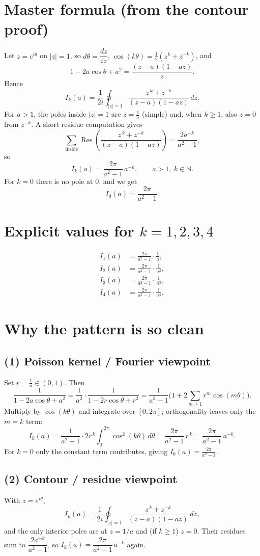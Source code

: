 \documentclass[11pt]{article}
\DeclareMathOperator{\Res}{Res}
\begin{document}
\section*{Master formula (from the contour proof)}
Let $z=e^{i\theta}$ on $|z|=1$, so $d\theta=\dfrac{dz}{iz}$, $\cos(k\theta)=\tfrac12(z^k+z^{-k})$, and
\[
1-2a\cos\theta+a^2=\frac{(z-a)(1-az)}{z}.
\]
Hence
\[
I_k(a)=\frac{1}{2i}\oint_{|z|=1}\frac{z^{\,k}+z^{-k}}{(z-a)(1-az)}\,dz.
\]
For $a>1$, the poles inside $|z|=1$ are $z=\frac1a$ (simple) and, when $k\ge1$, also $z=0$ from $z^{-k}$.
A short residue computation gives
\[
\sum_{\text{inside}}\Res
\left(\frac{z^{\,k}+z^{-k}}{(z-a)(1-az)}\right)
=\frac{2a^{-k}}{a^2-1},
\]
so
\[
\boxed{\ I_k(a)=\frac{2\pi}{a^2-1}\,a^{-k},\qquad a>1,\ k\in\mathbb N.\ }
\]
For $k=0$ there is no pole at $0$, and we get
\[
\boxed{\ I_0(a)=\frac{2\pi}{a^2-1}. \ }
\]

\section*{Explicit values for $k=1,2,3,4$}
\[
\begin{aligned}
	I_1(a) &= \frac{2\pi}{a^2-1}\cdot \frac{1}{a},\\[4pt]
	I_2(a) &= \frac{2\pi}{a^2-1}\cdot \frac{1}{a^{2}},\\[4pt]
	I_3(a) &= \frac{2\pi}{a^2-1}\cdot \frac{1}{a^{3}},\\[4pt]
	I_4(a) &= \frac{2\pi}{a^2-1}\cdot \frac{1}{a^{4}}.
\end{aligned}
\]

\section*{Why the pattern is so clean}
\subsection*{(1) Poisson kernel / Fourier viewpoint}
Set $r=\frac{1}{a}\in(0,1)$. Then
\[
\frac{1}{1-2a\cos\theta+a^2}
=\frac{1}{a^2}\cdot \frac{1}{1-2r\cos\theta+r^2}
=\frac{1}{a^2-1}\Big(1+2\sum_{m\ge1} r^{m}\cos(m\theta)\Big).
\]
Multiply by $\cos(k\theta)$ and integrate over $[0,2\pi]$; orthogonality leaves only the $m=k$ term:
\[
I_k(a)=\frac{1}{a^2-1}\cdot 2r^{\,k}\int_{0}^{2\pi}\cos^2(k\theta)\,d\theta
=\frac{2\pi}{a^2-1}\,r^{\,k}
=\frac{2\pi}{a^2-1}\,a^{-k}.
\]
For $k=0$ only the constant term contributes, giving $I_0(a)=\frac{2\pi}{a^2-1}$.

\subsection*{(2) Contour / residue viewpoint}
With $z=e^{i\theta}$,
\[
I_k(a)=\frac{1}{2i}\oint_{|z|=1}\frac{z^{\,k}+z^{-k}}{(z-a)(1-az)}\,dz,
\]
and the only interior poles are at $z=1/a$ and (if $k\ge1$) $z=0$. Their residues sum to $\dfrac{2a^{-k}}{a^2-1}$,
so $I_k(a)=\dfrac{2\pi}{a^2-1}\,a^{-k}$ again.
\end{document}
